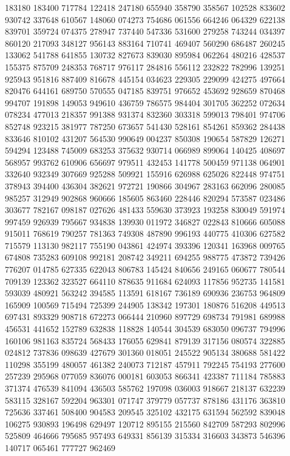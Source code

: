 {183180 183400 717784 122418 247180 655940 358790 358567 102528 833602 930742%
337648 610567 148060 074273 754686 061556 664246 064329 622138 839701 359724%
074375 278947 737440 547336 531600 279258 743244 034397 860120 217093 348127%
956143 883164 710741 469407 560290 686487 260245 133062 541788 641855 130732%
827673 839030 895984 062264 480216 428537 155375 875709 248353 768717 976117%
284816 556112 232822 782996 139251 925943 951816 887409 816678 445154 034623%
229305 229099 424275 497664 820476 644161 689750 570555 047185 839751 976652%
453692 928659 870468 994707 191898 149053 949610 436759 786575 984404 301705%
362252 072634 078234 477013 218357 991388 931374 832360 303318 599013 798401%
974706 852748 923215 381977 787250 673657 541430 528161 854261 859362 284438%
833646 810102 431207 564530 990649 004237 850308 190654 587829 126271 594294%
123488 745009 683253 375632 930714 066989 899064 140425 408697 568957 993762%
610906 656697 979511 432453 141778 500459 971138 064901 332640 932349 307669%
925288 509921 155916 626988 625026 822448 974751 378943 394400 436304 382621%
972721 190866 304967 283163 662096 280085 985257 312949 902868 960666 185605%
863460 228446 820294 573587 023486 303677 782167 098187 027626 481433 559630%
373923 193258 830049 591974 997459 926939 795667 934838 139930 011972 346827%
022843 810666 605088 915011 768619 790257 781363 749308 487890 996193 440775%
410306 627582 715579 113130 982117 755190 043861 424974 393396 120341 163968%
009765 674808 735283 609108 992181 208742 349211 694255 988775 473872 739426%
776207 014785 627335 622043 806783 145424 840656 249165 060677 780544 709139%
123362 323527 664110 878635 911684 624093 117856 952735 141581 593039 480921%
563242 394585 113591 618167 736189 690936 236753 964809 165909 100569 715494%
725399 244905 138342 197301 180876 516208 449513 697431 893329 908718 672273%
066444 210960 897729 698734 791981 689988 456531 441652 152789 632838 118828%
140544 304539 683050 096737 794996 160106 981163 835724 568433 176055 629841%
879139 317156 080574 322885 024812 737836 098639 427679 301360 018051 245522%
905134 380688 581422 110298 355199 480057 461382 240073 712187 457911 792245%
754193 277600 257239 295968 077059 836076 000181 603053 866341 423387 711184%
785883 371374 476539 841094 436503 585762 197098 036003 918667 218137 632239%
583115 328167 592204 963301 071747 379779 057737 878186 431176 363810 725636%
337461 508400 904583 209545 325102 432175 631594 562592 839048 106275 930893%
196498 629497 120712 895155 215560 842709 587293 802996 525809 464666 795685%
957493 649331 856139 315334 316603 343873 546396 140717 065461 777727 962469%
}
